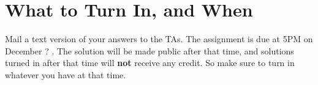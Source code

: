 \section{What to Turn In, and When}

Mail a text version of your answers to the TAs.
The assignment is due at 5PM on December ? .  The solution will be made
public after that time,  and solutions turned  in after that time will
{\bf not} receive any credit.   So make sure to  turn in whatever  you
have at that time.


